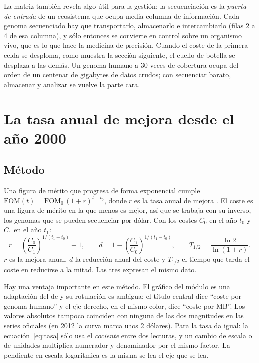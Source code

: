 \documentclass[11pt,letterpaper]{article}
\begin{document}
La matriz también revela algo útil para la gestión: la secuenciación es la
\emph{puerta de entrada} de un ecosistema que ocupa media columna de
información. Cada genoma secuenciado hay que transportarlo, almacenarlo e
intercambiarlo (filas 2 a 4 de esa columna), y sólo entonces se convierte en
control sobre un organismo vivo, que es lo que hace la medicina de precisión.
Cuando el coste de la primera celda se desploma, como muestra la sección
siguiente, el cuello de botella se desplaza a las demás. Un genoma humano a
30 veces de cobertura ocupa del orden de un centenar de gigabytes de datos
crudos; con secuenciar barato, almacenar y analizar se vuelve la parte cara.

\section{La tasa anual de mejora desde el año 2000}
\label{sec:tasa}

\subsection*{Método}

Una figura de mérito que progresa de forma exponencial cumple
$\mathrm{FOM}(t) = \mathrm{FOM}_0\,(1+r)^{t-t_0}$, donde $r$ es la tasa anual
de mejora \parencite{deweck2022}. El coste es una figura de mérito en la que
menos es mejor, así que se trabaja con su inverso, los genomas que se pueden
secuenciar por dólar. Con los costes $C_0$ en el año $t_0$ y $C_1$ en el año
$t_1$:
\begin{equation}
  r = \left(\frac{C_0}{C_1}\right)^{1/(t_1-t_0)} - 1,
  \qquad
  d = 1 - \left(\frac{C_1}{C_0}\right)^{1/(t_1-t_0)},
  \qquad
  T_{1/2} = \frac{\ln 2}{\ln(1+r)}.
  \label{eq:tasa}
\end{equation}
$r$ es la mejora anual, $d$ la reducción anual del coste y $T_{1/2}$ el tiempo
que tarda el coste en reducirse a la mitad. Las tres expresan el mismo dato.

Hay una ventaja importante en este método. El gráfico del módulo es una
adaptación del de \textcite{shendure2017} y su rotulación es ambigua: el título
central dice \enquote{coste por genoma humano} y el eje derecho, en el mismo
color, dice \enquote{coste por MB}. Los valores absolutos tampoco coinciden con
ninguna de las dos magnitudes en las series oficiales (en 2012 la curva marca
unos 2 dólares). Para la tasa da igual: la ecuación~\eqref{eq:tasa} sólo usa
el \emph{cociente} entre dos lecturas, y un cambio de escala o de unidades
multiplica numerador y denominador por el mismo factor. La pendiente en escala
logarítmica es la misma se lea el eje que se lea.
\end{document}

